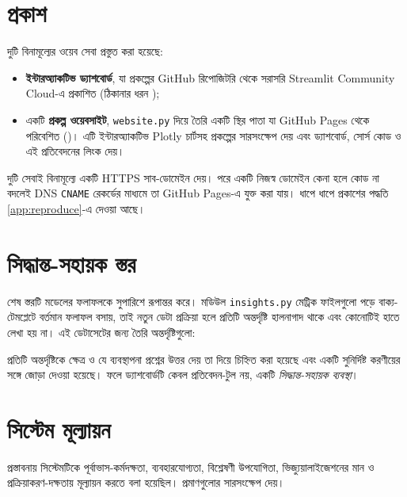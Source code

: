 \section{প্রকাশ}
দুটি বিনামূল্যের ওয়েব সেবা প্রস্তুত করা হয়েছে:
\begin{itemize}
  \item \textbf{ইন্টারঅ্যাকটিভ ড্যাশবোর্ড}, যা প্রকল্পের GitHub রিপোজিটরি থেকে সরাসরি Streamlit Community Cloud-এ প্রকাশিত
        (ঠিকানার ধরন \dashurl);
  \item একটি \textbf{প্রকল্প ওয়েবসাইট}, \texttt{website.py} দিয়ে তৈরি একটি স্থির পাতা যা GitHub Pages থেকে পরিবেশিত (\siteurl)। এটি
        ইন্টারঅ্যাকটিভ Plotly চার্টসহ প্রকল্পের সারসংক্ষেপ দেয় এবং ড্যাশবোর্ড, সোর্স কোড ও এই প্রতিবেদনের লিংক দেয়।
\end{itemize}
দুটি সেবাই বিনামূল্যে একটি HTTPS সাব-ডোমেইন দেয়। পরে একটি নিজস্ব ডোমেইন কেনা হলে কোড না বদলেই DNS \texttt{CNAME} রেকর্ডের মাধ্যমে তা
GitHub Pages-এ যুক্ত করা যায়। ধাপে ধাপে প্রকাশের পদ্ধতি \cref{app:reproduce}-এ দেওয়া আছে।

\section{সিদ্ধান্ত-সহায়ক স্তর}
শেষ স্তরটি মডেলের ফলাফলকে সুপারিশে রূপান্তর করে। মডিউল \texttt{insights.py} মেট্রিক ফাইলগুলো পড়ে বাক্য-টেমপ্লেটে বর্তমান ফলাফল
বসায়, তাই নতুন ডেটা প্রক্রিয়া হলে প্রতিটি অন্তর্দৃষ্টি হালনাগাদ থাকে এবং কোনোটিই হাতে লেখা হয় না। এই ডেটাসেটের জন্য তৈরি অন্তর্দৃষ্টিগুলো:



প্রতিটি অন্তর্দৃষ্টিকে ক্ষেত্র ও যে ব্যবস্থাপনা প্রশ্নের উত্তর দেয় তা দিয়ে চিহ্নিত করা হয়েছে এবং একটি সুনির্দিষ্ট করণীয়ের সঙ্গে জোড়া দেওয়া হয়েছে।
ফলে ড্যাশবোর্ডটি কেবল প্রতিবেদন-টুল নয়, একটি \emph{সিদ্ধান্ত-সহায়ক ব্যবস্থা}।

\section{সিস্টেম মূল্যায়ন}
প্রস্তাবনায় সিস্টেমটিকে পূর্বাভাস-কর্মদক্ষতা, ব্যবহারযোগ্যতা, বিশ্লেষণী উপযোগিতা, ভিজ্যুয়ালাইজেশনের মান ও প্রক্রিয়াকরণ-দক্ষতায় মূল্যায়ন
করতে বলা হয়েছিল।  প্রমাণগুলোর সারসংক্ষেপ দেয়।

